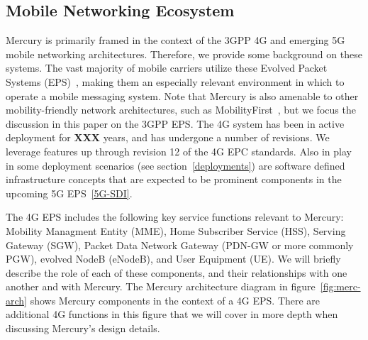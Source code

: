 \subsection{Mobile Networking Ecosystem}

Mercury is primarily framed in the context of the 3GPP 4G and emerging
5G mobile networking architectures. Therefore, we provide some
background on these systems.  The vast majority of mobile carriers
utilize these Evolved Packet Systems (EPS)~\cite{mobile-stats}, making
them an especially relevant environment in which to operate a mobile
messaging system.  Note that Mercury is also amenable to other
mobility-friendly network architectures, such as
MobilityFirst~\cite{mobility-first}, but we focus the discussion in
this paper on the 3GPP EPS.  The 4G system has been in active
deployment for {\bf XXX} years, and has undergone a number of
revisions. We leverage features up through revision 12 of the 4G EPC
standards.  Also in play in some deployment scenarios (see
section~\ref{deployments}) are software defined infrastructure
concepts that are expected to be prominent components in the upcoming
5G EPS~\ref{5G-SDI}.

The 4G EPS includes the following key service functions relevant to
Mercury: Mobility Managment Entity (MME), Home Subscriber Service
(HSS), Serving Gateway (SGW), Packet Data Network Gateway (PDN-GW or
more commonly PGW), evolved NodeB (eNodeB), and User Equipment (UE).
We will briefly describe the role of each of these components, and
their relationships with one another and with Mercury. The Mercury
architecture diagram in figure~\ref{fig:merc-arch} shows Mercury
components in the context of a 4G EPS.  There are additional 4G
functions in this figure that we will cover in more depth when
discussing Mercury's design details.

